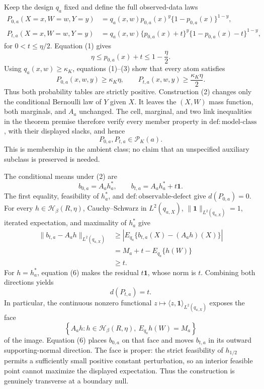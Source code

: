 Keep the design \(q_a\) fixed and define the full observed-data laws
\[
\begin{aligned}
P_{0,a}(X=x,W=w,Y=y)
&=q_a(x,w)p_{0,a}(x)^y\{1-p_{0,a}(x)\}^{1-y},\\
P_{t,a}(X=x,W=w,Y=y)
&=q_a(x,w)\{p_{0,a}(x)+t\}^y
  \{1-p_{0,a}(x)-t\}^{1-y},
\end{aligned} \tag{2}
\]
for \(0<t\le\eta/2\).  Equation (1) gives
\[
\eta\le p_{0,a}(x)+t\le1-\frac\eta2. \tag{3}
\]
Using \(q_a(x,w)\ge\kappa_K\), equations (1)--(3) show that every atom satisfies
\[
P_{0,a}(x,w,y)\ge\kappa_K\eta,
\qquad P_{t,a}(x,w,y)\ge\frac{\kappa_K\eta}{2}. \tag{4}
\]
Thus both probability tables are strictly positive.  Construction (2) changes only the conditional Bernoulli law of \(Y\) given \(X\).  It leaves the \((X,W)\) mass function, both marginals, and \(A_a\) unchanged.  The cell, marginal, and two link inequalities in the theorem premise therefore verify every member property in \(\mathrm{def:model\mbox{-}class}\), with their displayed slacks, and hence
\[
P_{0,a},P_{t,a}\in\mathcal P_K(a). \tag{5}
\]
This is membership in the ambient class; no claim that an unspecified auxiliary subclass is preserved is needed.

The conditional means under (2) are
\[
b_{0,a}=A_ah_a^*,
\qquad b_{t,a}=A_ah_a^*+t\mathbf 1. \tag{6}
\]
The first equality, feasibility of \(h_a^*\), and \(\mathrm{def:observable\mbox{-}defect}\) give \(d(P_{0,a})=0\).  For every \(h\in\mathcal H_\beta(R,\eta)\), Cauchy--Schwarz in \(L^2(q_{a,X})\), \(\|\mathbf1\|_{L^2(q_{a,X})}=1\), iterated expectation, and maximality of \(h_a^*\) give
\[
\begin{aligned}
\|b_{t,a}-A_ah\|_{L^2(q_{a,X})}
&\ge \left|E_{q_a}\{b_{t,a}(X)-(A_ah)(X)\}\right|\\
&=M_a+t-E_{q_a}\{h(W)\}\\
&\ge t. 
\end{aligned} \tag{7}
\]
For \(h=h_a^*\), equation (6) makes the residual \(t\mathbf1\), whose norm is \(t\).  Combining both directions yields
\[
d(P_{t,a})=t. \tag{8}
\]
In particular, the continuous nonzero functional \(z\mapsto\langle z,\mathbf1\rangle_{L^2(q_{a,X})}\) exposes the face
\[
\left\{A_ah:h\in\mathcal H_\beta(R,\eta),\ E_{q_a}h(W)=M_a\right\}
\]
of the image.  Equation (6) places \(b_{0,a}\) on that face and moves \(b_{t,a}\) in its outward supporting-normal direction.  The face is proper: the strict feasibility of \(h_{1/2}\) permits a sufficiently small positive constant perturbation, so an interior feasible point cannot maximize the displayed expectation.  Thus the construction is genuinely transverse at a boundary null.

